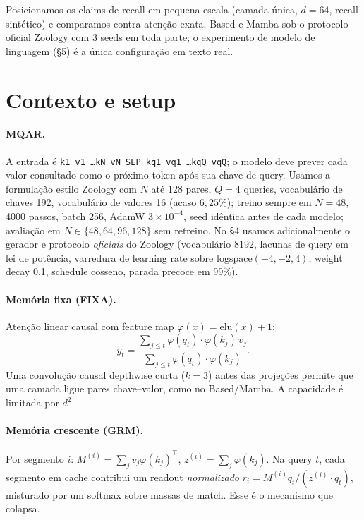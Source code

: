 \documentclass[11pt]{article}
\begin{document}
Posicionamos os claims de recall em pequena escala (camada \'unica, $d=64$,
recall sint\'etico) e comparamos contra aten\c{c}\~ao exata, Based
\citep{arora2024based} e Mamba \citep{gu2023mamba} sob o protocolo oficial Zoology
\citep{arora2023zoology} com 3 seeds em toda parte; o experimento de modelo de
linguagem (\S5) \'e a \'unica configura\c{c}\~ao em texto real.

\section{Contexto e setup}

\paragraph{MQAR.} A entrada \'e \texttt{k1 v1 \ldots kN vN SEP kq1 vq1 \ldots kqQ
vqQ}; o modelo deve prever cada valor consultado como o pr\'oximo token ap\'os sua
chave de query. Usamos a formula\c{c}\~ao estilo Zoology com $N$ at\'e 128 pares,
$Q=4$ queries, vocabul\'ario de chaves 192, vocabul\'ario de valores 16 (acaso
$6{,}25\%$); treino sempre em $N=48$, 4000 passos, batch 256, AdamW
$3\times10^{-4}$, seed id\^entica antes de cada modelo; avalia\c{c}\~ao em
$N\in\{48,64,96,128\}$ sem retreino. No \S4 usamos adicionalmente o gerador e
protocolo \emph{oficiais} do Zoology (vocabul\'ario 8192, lacunas de query em lei
de pot\^encia, varredura de learning rate sobre $\mathrm{logspace}(-4,-2,4)$,
weight decay 0{,}1, schedule cosseno, parada precoce em $99\%$).

\paragraph{Mem\'oria fixa (FIXA).} Aten\c{c}\~ao linear causal
\citep{katharopoulos2020linear} com feature map
$\varphi(x)=\mathrm{elu}(x)+1$:
\[
y_t = \frac{\sum_{j\le t}\varphi(q_t)\!\cdot\!\varphi(k_j)\,v_j}
            {\sum_{j\le t}\varphi(q_t)\!\cdot\!\varphi(k_j)}.
\]
Uma convolu\c{c}\~ao causal depthwise curta ($k=3$) antes das proje\c{c}\~oes
permite que uma camada ligue pares chave--valor, como no Based/Mamba. A
capacidade \'e limitada por $d^2$.

\paragraph{Mem\'oria crescente (GRM).} Por segmento $i$:
$M^{(i)}=\sum_j v_j\varphi(k_j)^\top$,
$z^{(i)}=\sum_j\varphi(k_j)$. Na query $t$, cada segmento em cache contribui um
readout \emph{normalizado}
$r_i = M^{(i)}q_t / (z^{(i)}\!\cdot\!q_t)$, misturado por um softmax sobre massas
de match. Esse \'e o mecanismo que colapsa.
\end{document}
